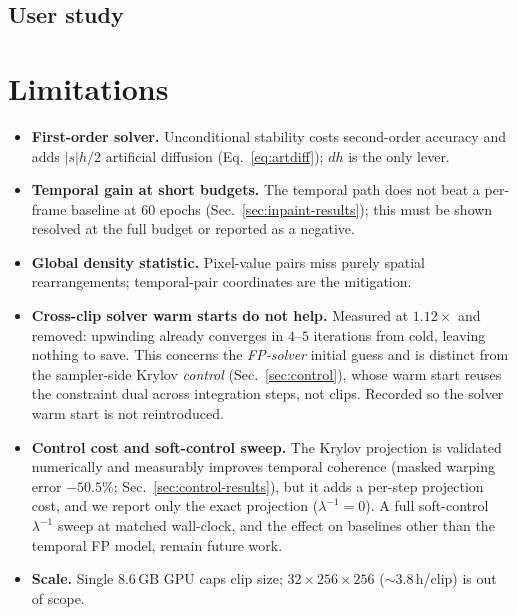 \subsection{User study}

\section{Limitations}
\begin{itemize}
  \item \textbf{First-order solver.} Unconditional stability costs second-order
        accuracy and adds $|s|h/2$ artificial diffusion (Eq.~\ref{eq:artdiff});
        $dh$ is the only lever.
  \item \textbf{Temporal gain at short budgets.} The temporal path does not beat
        a per-frame baseline at 60 epochs (Sec.~\ref{sec:inpaint-results}); this
        must be shown resolved at the full budget or reported as a negative.
  \item \textbf{Global density statistic.} Pixel-value pairs miss purely spatial
        rearrangements; temporal-pair coordinates are the mitigation.
  \item \textbf{Cross-clip solver warm starts do not help.} Measured at
        $1.12\times$ and removed: upwinding already converges in $4$--$5$
        iterations from cold, leaving nothing to save. This concerns the
        \emph{FP-solver} initial guess and is distinct from the sampler-side
        Krylov \emph{control} (Sec.~\ref{sec:control}), whose warm start reuses
        the constraint dual across integration steps, not clips. Recorded so the
        solver warm start is not reintroduced.
  \item \textbf{Control cost and soft-control sweep.} The Krylov projection is
        validated numerically and measurably improves temporal coherence (masked
        warping error $-50.5\%$; Sec.~\ref{sec:control-results}), but it adds a
        per-step projection cost, and we report only the exact projection
        ($\lambda^{-1}{=}0$). A full soft-control $\lambda^{-1}$ sweep at matched
        wall-clock, and the effect on baselines other than the temporal FP model,
        remain future work.
  \item \textbf{Scale.} Single 8.6\,GB GPU caps clip size; $32\times256\times256$
        ($\sim\!3.8$\,h/clip) is out of scope.
\end{itemize}

